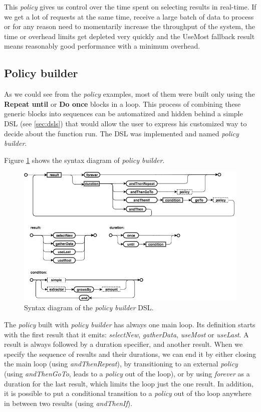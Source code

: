 This \textit{policy} gives us control over the time spent on selecting results in real-time. If we get a lot of requests at the same time, receive a large batch of data to process or for any reason need to momentarily increase the throughput of the system, the time or overhead limits get depleted very quickly and the UseMost fallback result means reasonably good performance with a minimum overhead.

\subsection{Policy builder}

As we could see from the \textit{policy} examples, most of them were built only using the \textbf{Repeat until} or \textbf{Do once} blocks in a loop. This process of combining these generic blocks into sequences can be automatized and hidden behind a simple DSL (see \ref{sec:dsls}) that would allow the user to express his customized way to decide about the function run. The DSL was implemented and named \textit{policy builder}.

Figure \ref{fig:policy_builder_chart} shows the syntax diagram of \textit{policy builder}.

\begin{figure}[h!]
	\captionsetup{justification=centering,margin=0.5cm}
	\centerline{\mbox{\includegraphics[width=130mm]{./img/policy_builder_chart.png}}}
	\caption{Syntax diagram of the \textit{policy builder} DSL.}
	\label{fig:policy_builder_chart}
\end{figure}

The \textit{policy} built with \textit{policy builder} has always one main loop. Its definition starts with the first result that it emits: \textit{selectNew}, \textit{gatherData}, \textit{useMost} or \textit{useLast}. A result is always followed by a duration specifier, and another result. When we specify the sequence of results and their durations, we can end it by either closing the main loop (using \textit{andThenRepeat}), by transitioning to an external \textit{policy} (using \textit{andThenGoTo}, leads to a \textit{policy} out of the loop), or by using \textit{forever} as a duration for the last result, which limits the loop just the one result. In addition, it is possible to put a conditional transition to a \textit{policy} out of tho loop anywhere in between two results (using \textit{andThenIf}).


